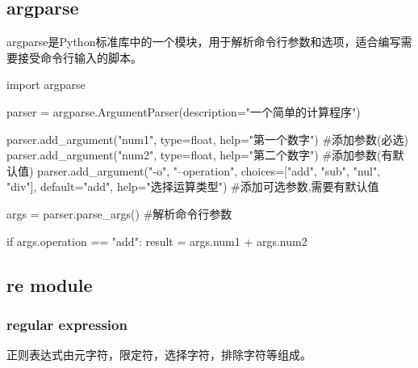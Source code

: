   \subsection{argparse}
    argparse是Python标准库中的一个模块，用于解析命令行参数和选项，适合编写需要接受命令行输入的脚本。
    \begin{codeblock}[language=python, caption={argparse}]
      import argparse

      parser = argparse.ArgumentParser(description="一个简单的计算程序")
      
      parser.add_argument("num1", type=float, help="第一个数字") #添加参数(必选)
      parser.add_argument("num2", type=float, help="第二个数字") #添加参数(有默认值)
      parser.add_argument("-o", "--operation", choices=["add", "sub", "nul", "div"],
          default="add", help="选择运算类型") #添加可选参数,需要有默认值

      args = parser.parse_args() #解析命令行参数

      if args.operation == "add":
         result = args.num1 + args.num2
    \end{codeblock}

  \subsection{re module}
  
    \subsubsection{regular expression}
      正则表达式由元字符，限定符，选择字符，排除字符等组成。

